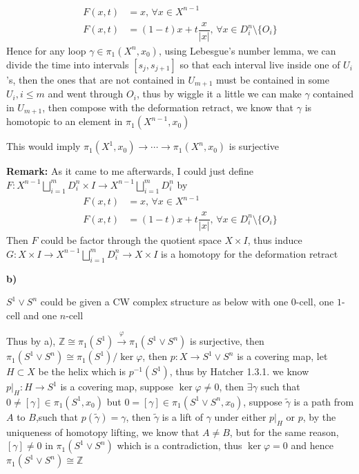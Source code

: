 \documentclass[../main.tex]{subfiles}
\begin{document}
\[
\begin{aligned}
F(x,t)&=x, \,\forall x\in X^{n-1} \\
F(x,t)&=(1-t)x+t\dfrac{x}{|x|}, \,\forall x\in D^{n}_{i}\setminus\{O_{i}\}
\end{aligned}
\]
Hence for any loop $\gamma\in\pi_{1}(X^{n},x_{0})$, using Lebesgue's number lemma, we can divide the time into intervals $[s_{j},s_{j+1}]$ so that each interval live inside one of $U_{i}$'s, then the ones that are not contained in $U_{m+1}$ must be contained in some $U_{i}, i\leq m$ and went through $O_{i}$, thus by wiggle it a little we can make $\gamma$ contained in $U_{m+1}$, then compose with the deformation retract, we know that $\gamma$ is homotopic to an element in $\pi_{1}(X^{n-1},x_{0})$ \par
This would imply $\pi_{1}(X^{1},x_{0})\rightarrow\cdots\rightarrow\pi_{1}(X^{n},x_{0})$ is surjective \par
\textbf{Remark:} As it came to me afterwards, I could just define $F: X^{n-1}\bigsqcup_{i=1}^{m}D_{i}^{n}\times I\rightarrow X^{n-1}\bigsqcup_{i=1}^{m}D_{i}^{n}$ by 
\[
\begin{aligned}
F(x,t)&=x, \,\forall x\in X^{n-1} \\
F(x,t)&=(1-t)x+t\dfrac{x}{|x|}, \,\forall x\in D^{n}_{i}\setminus\{O_{i}\}
\end{aligned}
\]
Then $F$ could be factor through the quotient space $X\times I$, thus induce $G: X\times I\rightarrow X^{n-1}\bigsqcup_{i=1}^{m}D_{i}^{n}\rightarrow X\times I$ is a homotopy for the deformation retract \par
\textbf{b)} \par
$S^{1}\vee S^{n}$ could be given a CW complex structure as below with one $0$-cell, one $1$-cell and one $n$-cell
\begin{center}
\end{center}
Thus by a), $\mathbb{Z}\cong \pi_{1}(S^{1})\overset{\varphi}{\rightarrow}\pi_{1}(S^{1}\vee S^{n})$ is surjective, then $\pi_{1}(S^{1}\vee S^{n})\cong\pi_{1}(S^{1}) /\ker\varphi$, then $p: X\rightarrow S^{1}\vee S^{n}$ is a covering map, let $H\subset X$ be the helix which is $p^{-1}(S^{1})$, thus by Hatcher 1.3.1. we know $p|_{H}: H\rightarrow S^{1}$ is a covering map, suppose $\ker\varphi\neq 0$, then $\exists \gamma$ such that $0\neq[\gamma]\in\pi_{1}(S^{1},x_{0})$ but $0=[\gamma]\in\pi_{1}(S^{1}\vee S^{n},x_{0})$, suppose $\widetilde{\gamma}$ is a path from $A$ to $B$,such that $p(\widetilde{\gamma})=\gamma$, then $\widetilde{\gamma}$ is a lift of $\gamma$ under either $p|_{H}$ or $p$, by the uniqueness of homotopy lifting, we know that $A\neq B$, but for the same reason, $[\gamma]\neq 0$ in $\pi_{1}(S^{1}\vee S^{n})$ which is a contradiction, thus $\ker\varphi=0$ and  hence $\pi_{1}(S^{1}\vee S^{n})\cong\mathbb{Z}$
\end{document}
